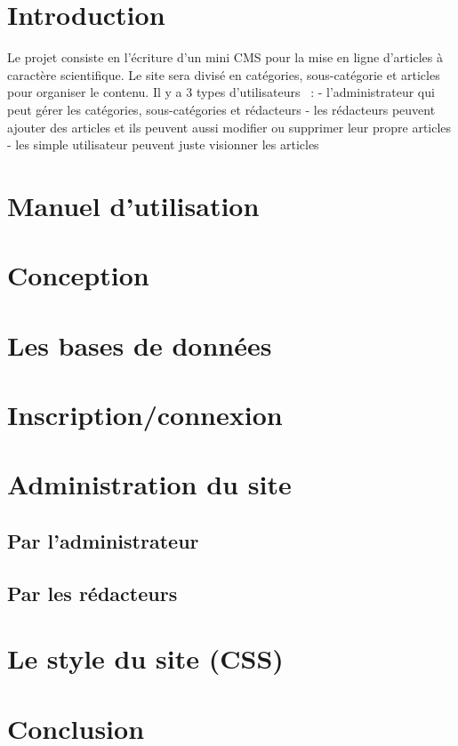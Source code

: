 \documentclass[11pt, openany]{report}
\begin{document}
\newpage
\tableofcontents

\newpage
\section{Introduction}
Le projet consiste en l'écriture d'un mini CMS pour la mise en ligne d'articles à caractère scientifique.
Le site sera divisé en catégories, sous-catégorie et articles pour organiser le contenu.
Il y a 3 types d'utilisateurs ~: 
- l'administrateur qui peut gérer les catégories, sous-catégories et rédacteurs
- les rédacteurs peuvent ajouter des articles et ils peuvent aussi modifier ou supprimer leur propre articles 
- les simple utilisateur peuvent juste visionner les articles

\newpage
\section{Manuel d'utilisation}

\newpage
\section{Conception}

\newpage
\section{Les bases de données}


\newpage
\section{Inscription/connexion}


\newpage
\section{Administration du site}
\subsection{Par l'administrateur}

\subsection{Par les rédacteurs}


\newpage
\section{Le style du site (CSS)}

\newpage
\section{Conclusion}
\end{document}
